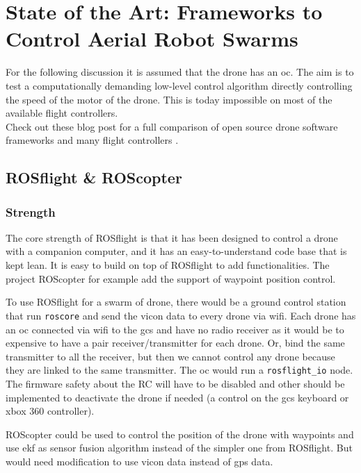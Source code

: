 \chapter{State of the Art: Frameworks to Control Aerial Robot Swarms}
    
    For the following discussion it is assumed that the drone has an \gls{oc}.
    The aim is to test a computationally demanding low-level control algorithm directly controlling the speed of the motor of the drone. This is today impossible on most of the available flight controllers.\\
    Check out these blog post for a full comparison of open source drone software frameworks \cite{drone_software_projects} and many flight controllers \cite{drone_flight_controllers}.
    \section{ROSflight \& ROScopter}
    \subsection{Strength}
    The core strength of ROSflight is that it has been designed to control a drone with a companion computer, and it has an easy-to-understand code base that is kept lean.
    It is easy to build on top of ROSflight to add functionalities. The project ROScopter \cite{github_roscopter} for example add the support of waypoint position control.
    
    To use ROSflight for a swarm of drone, there would be a ground control station that run \texttt{roscore} and send the vicon data to every drone via wifi.
    Each drone has an \gls{oc} connected via wifi to the \acrlong{gcs} and have no radio receiver as it would be to expensive to have a pair receiver/transmitter for each drone. Or, bind the same transmitter to all the receiver, but then we cannot control any drone because they are linked to the same transmitter.
    The \gls{oc} would run a \texttt{rosflight\_io} node.
    The firmware safety about the RC will have to be disabled and other should be implemented to deactivate the drone if needed (a control on the \gls{gcs} keyboard or xbox 360 controller).
    
    ROScopter could be used to control the position of the drone with waypoints and use \gls{ekf} as sensor fusion algorithm instead of the simpler one from ROSflight. But would need modification to use vicon data instead of gps data.
    
